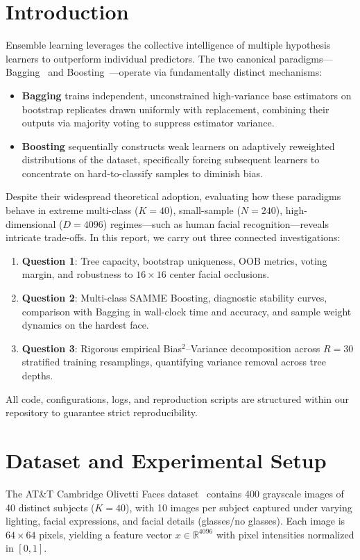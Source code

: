 \documentclass[10pt,twocolumn,letterpaper]{article}
\begin{document}
\section{Introduction}
\label{sec:intro}
Ensemble learning leverages the collective intelligence of multiple hypothesis learners to outperform individual predictors. The two canonical paradigms—Bagging~\cite{breiman1996bagging} and Boosting~\cite{zhu2009multi}—operate via fundamentally distinct mechanisms:
\begin{itemize}
    \item \textbf{Bagging} trains independent, unconstrained high-variance base estimators on bootstrap replicates drawn uniformly with replacement, combining their outputs via majority voting to suppress estimator variance.
    \item \textbf{Boosting} sequentially constructs weak learners on adaptively reweighted distributions of the dataset, specifically forcing subsequent learners to concentrate on hard-to-classify samples to diminish bias.
\end{itemize}

Despite their widespread theoretical adoption, evaluating how these paradigms behave in extreme multi-class ($K=40$), small-sample ($N=240$), high-dimensional ($D=4096$) regimes—such as human facial recognition—reveals intricate trade-offs. In this report, we carry out three connected investigations:
\begin{enumerate}
    \item \textbf{Question 1}: Tree capacity, bootstrap uniqueness, OOB metrics, voting margin, and robustness to $16 \times 16$ center facial occlusions.
    \item \textbf{Question 2}: Multi-class SAMME Boosting, diagnostic stability curves, comparison with Bagging in wall-clock time and accuracy, and sample weight dynamics on the hardest face.
    \item \textbf{Question 3}: Rigorous empirical Bias$^2$--Variance decomposition across $R=30$ stratified training resamplings, quantifying variance removal across tree depths.
\end{enumerate}

All code, configurations, logs, and reproduction scripts are structured within our repository to guarantee strict reproducibility.

\section{Dataset and Experimental Setup}
\label{sec:setup}
The AT\&T Cambridge Olivetti Faces dataset~\cite{samaria1994parameterisation} contains 400 grayscale images of 40 distinct subjects ($K=40$), with 10 images per subject captured under varying lighting, facial expressions, and facial details (glasses/no glasses). Each image is $64 \times 64$ pixels, yielding a feature vector $x \in \mathbb{R}^{4096}$ with pixel intensities normalized in $[0, 1]$.
\end{document}
